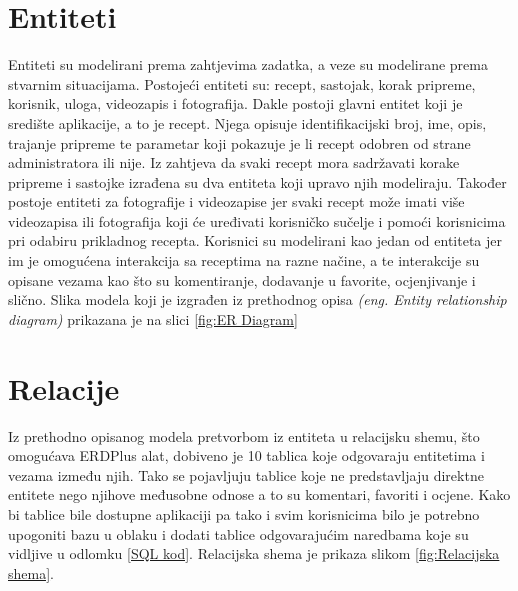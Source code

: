 \documentclass[times, utf8, zavrsni]{fer}
\begin{document}
\section{Entiteti}
Entiteti su modelirani prema zahtjevima zadatka, a veze su modelirane prema stvarnim situacijama.
Postojeći entiteti su: recept, sastojak, korak pripreme, korisnik, uloga, videozapis i
fotografija. Dakle postoji glavni entitet koji je središte aplikacije, a to je recept.
Njega opisuje identifikacijski broj, ime, opis, trajanje pripreme
te parametar koji pokazuje je li recept odobren od strane administratora ili nije.
Iz zahtjeva da svaki recept mora sadržavati korake pripreme i sastojke izrađena su dva entiteta
koji upravo njih modeliraju.
Također postoje entiteti za fotografije i videozapise jer svaki recept može imati
više videozapisa ili fotografija koji će uređivati korisničko sučelje
i pomoći korisnicima pri odabiru prikladnog recepta.
Korisnici su modelirani kao jedan od entiteta jer im je omogućena interakcija sa receptima
na razne načine, a te interakcije su opisane vezama kao što su komentiranje,
dodavanje u favorite, ocjenjivanje i slično. Slika modela koji je izgrađen iz prethodnog opisa
\textit{(eng. Entity relationship diagram)} prikazana je na slici \ref{fig:ER Diagram}

\section{Relacije}
Iz prethodno opisanog modela pretvorbom iz entiteta u relacijsku shemu, što omogućava
ERDPlus alat, dobiveno je 10 tablica koje odgovaraju
entitetima i vezama između njih. Tako se pojavljuju tablice koje ne predstavljaju direktne entitete
nego njihove međusobne odnose a to su komentari, favoriti i ocjene. Kako bi tablice bile dostupne aplikaciji pa tako i svim
korisnicima bilo je potrebno upogoniti bazu u oblaku i dodati tablice odgovarajućim naredbama
koje su vidljive u odlomku \ref{SQL kod}.
Relacijska shema je prikaza slikom \ref{fig:Relacijska shema}.
\end{document}
